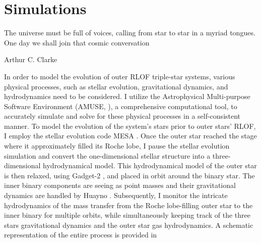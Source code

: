 \chapter{Simulations}\label{simulations}

\epigraph{The universe must be full of voices, calling from star to star in a myriad tongues. One day we shall join that cosmic conversation}{Arthur C. Clarke}


In order to model the evolution of outer RLOF triple-star systems, various physical processes, such as stellar evolution, gravitational dynamics, and hydrodynamics need to be considered. I utilize the Astrophysical Multi-purpose Software Environment (AMUSE, \cite{portegies2018astrophysical}), a comprehensive computational tool, to accurately simulate and solve for these physical processes in a self-consistent manner. To model the evolution of the system's stars prior to outer stars' RLOF, I employ the stellar evolution code MESA \citep{paxton2010modules,paxton2013modules,paxton2015modules,paxton2019modules}. Once the outer star reached the stage where it approximately filled its Roche lobe, I pause the stellar evolution simulation and convert the one-dimensional stellar structure into a three-dimensional hydrodynamical model. This hydrodynamical model of the outer star is then relaxed, using Gadget-2 \citep{springel2005cosmological}, and placed in orbit around the binary star. The inner binary components are seeing as point masses and their gravitational dynamics are handled by Huayno \citep{pelupessy2012n}. Subsequently, I monitor the intricate hydrodynamics of the mass transfer from the Roche lobe-filling outer star to the inner binary for multiple orbits, while simultaneously keeping track of the three stars gravitational dynamics and the outer star gas hydrodynamics. A schematic representation of the entire process is provided in 




